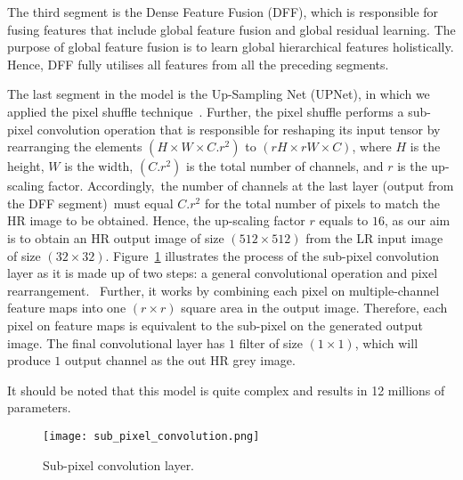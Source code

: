 The third segment is the Dense Feature Fusion (DFF), which is responsible for fusing features that include global feature fusion and global residual learning.
The purpose of global feature fusion is to learn global hierarchical features holistically.
Hence, DFF fully utilises all features from all the preceding segments.

The last segment in the model is the Up-Sampling Net (UPNet), in which we applied the pixel shuffle technique~\cite{Shi2016}.
Further, the pixel shuffle performs a sub-pixel convolution operation that is responsible for reshaping its input tensor by rearranging the elements \((H\times W\times C.r^2)\) to \((rH\times rW\times C)\), where \(H\) is the height, \(W\) is the width, \((C.r^2)\) is the total number of channels, and \(r\) is the up-scaling factor.
Accordingly, the number of channels at the last layer (output from the DFF segment) must equal \(C.r^2\) for the total number of pixels to match the HR image to be obtained.
Hence, the up-scaling factor \(r\) equals to \(16\), as our aim is to obtain an HR output image of size \((512\times 512)\) from the LR input image of size \((32\times 32)\).
Figure~\ref{fig:sub_pixel_layer} illustrates the process of the sub-pixel convolution layer as it is made up of two steps: a general convolutional operation and pixel rearrangement. 
Further, it works by combining each pixel on multiple-channel feature maps into one \((r\times r)\) square area in the output image. 
Therefore, each pixel on feature maps is equivalent to the sub-pixel on the generated output image.
The final convolutional layer has \(1\) filter of size \((1\times 1)\), which will produce \(1\) output channel as the out HR grey image. 

It should be noted that this model is quite complex and results in 12 millions of parameters.
\begin{figure} [h!]
	\begin{center}
		\texttt{[image: sub\_pixel\_convolution.png]}
	\end{center}
	\caption{Sub-pixel convolution layer.} 
	\label{fig:sub_pixel_layer}
\end{figure}
